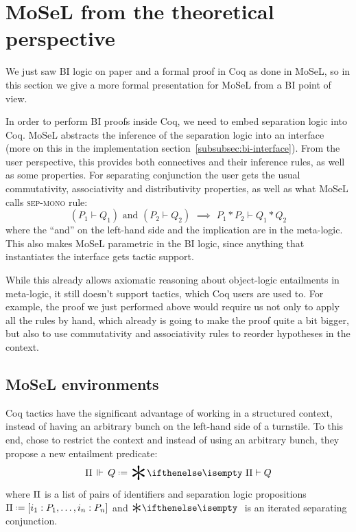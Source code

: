 \section{MoSeL from the theoretical perspective}
\label{sec:ipm_theory}

We just saw BI logic on paper and a formal proof in Coq as done in MoSeL, so in this section we give a more formal presentation for MoSeL from a BI point of view.

In order to perform BI proofs inside Coq, we need to embed separation logic into Coq.
MoSeL abstracts the inference of the separation logic into an interface (more on this in the implementation section~\ref{subsubsec:bi-interface}).
From the user perspective, this provides both connectives and their inference rules, as well as some properties.
For separating conjunction the user gets the usual commutativity, associativity and distributivity properties, as well as what MoSeL calls \textsc{sep-mono} rule:
\[(P_1 \vdash Q_1) \text{ and } (P_2 \vdash Q_2) \,\, \implies \,\, P_1 * P_2 \vdash Q_1 * Q_2\]
where the ``and'' on the left-hand side and the implication are in the meta-logic.
This also makes MoSeL parametric in the BI logic, since anything that instantiates the interface gets tactic support.

While this already allows axiomatic reasoning about object-logic entailments in meta-logic, it still doesn't support tactics, which Coq users are used to.
For example, the proof we just performed above would require us not only to apply all the rules by hand, which already is going to make the proof quite a bit bigger, but also to
use commutativity and associativity rules to reorder hypotheses in the context.

\subsection{MoSeL environments}
\label{sec:mosel-environments}

Coq tactics have the significant advantage of working in a structured context, instead of having an arbitrary bunch on the left-hand side of a turnstile.
To this end, \citet{krebbersInteractiveProofsHigherorder2017} chose to restrict the context and instead of using an arbitrary bunch, they propose a new entailment predicate:
\[\entailsOneD Q \defeq \Sep \Pi \vdash Q\]
where \(\Pi\) is a list of pairs of identifiers and separation logic propositions \(\SpatD \defeq \left[i_1 : P_1, \ldots , i_n : P_n \right]\) and \(\Sep\) is an iterated separating conjunction.

